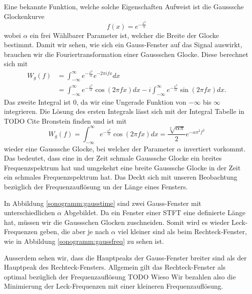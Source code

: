 Eine bekannte Funktion, welche solche Eigenschaften Aufweist ist die Gausssche Glockenkurve
\begin{equation}
    f(x) = e^{-\frac{x^2}{\alpha}}
\end{equation}
wobei $\alpha$ ein frei Wählbarer Parameter ist, welcher die Breite der Glocke 
bestimmt.
Damit wir sehen, wie sich ein Gauss-Fenster auf das Signal auswirkt, brauchen wir
die Fouriertransformation einer Gaussschen Glocke.
Diese berechnet sich mit 
\begin{align}
    W_g(f) &= \int_{-\infty}^{\infty} e^{-\frac{x^2}{\alpha}} e^{- 2 \pi i f x} dx\\
    &= \int_{-\infty}^{\infty} e^{-\frac{x^2}{\alpha}} \cos(2 \pi f x) dx -
    i \int_{-\infty}^{\infty} e^{-\frac{x^2}{\alpha}} \sin(2 \pi f x) dx .
\end{align}
Das zweite Integral ist 0, da wir eine Ungerade Funktion von $-\infty$ bis $\infty$ integrieren.
Die Lösung des ersten Integrals lässt sich mit der Integral Tabelle in TODO Cite Bronstein finden und ist mit
\begin{equation}
    W_g(f) = \int_{-\infty}^{\infty} e^{-\frac{x^2}{\alpha}} \cos(2 \pi f x) dx =
    \frac{\sqrt[2]{\alpha \pi}}{2} e^{-\alpha \pi^2 f^2}
\end{equation}
wieder eine Gausssche Glocke, bei welcher der Parameter $\alpha$ invertiert vorkommt.
Das bedeutet, dass eine in der Zeit schmale Gausssche Glocke ein breites Frequenzspektrum hat und umgekehrt eine
breite Gausssche Glocke in der Zeit ein schmales Frequenzspektrum hat.
Das Deckt sich mit unseren Beobachtung bezüglich der Frequenzauflösung un der Länge eines Fensters.

In Abbildung \ref{sonogramm:gausstime} sind zwei Gauss-Fenster mit unterschiedlichen 
$\alpha$ Abgebildet.
Da ein Fenster einer STFT eine definierte Länge hat, müssen wir die Gaussschen Glocken 
zuschneiden. 
Somit wird es wieder Leck-Frequenzen geben, die aber je nach $\alpha$ viel kleiner sind
als beim Rechteck-Fenster, wie in Abbildung \ref{sonogramm:gaussfreq} zu sehen ist.

Ausserdem sehen wir, dass die Hauptpeaks der Gauss-Fenster breiter sind als der 
Hauptpeak des Rechteck-Fensters.
Allgemein gilt das Rechteck-Fenster als optimal bezüglich der Frequenzauflösung
TODO Wieso
Wir bezahlen also die Minimierung der Leck-Frequenzen mit einer kleineren Frequenzauflösung. 


